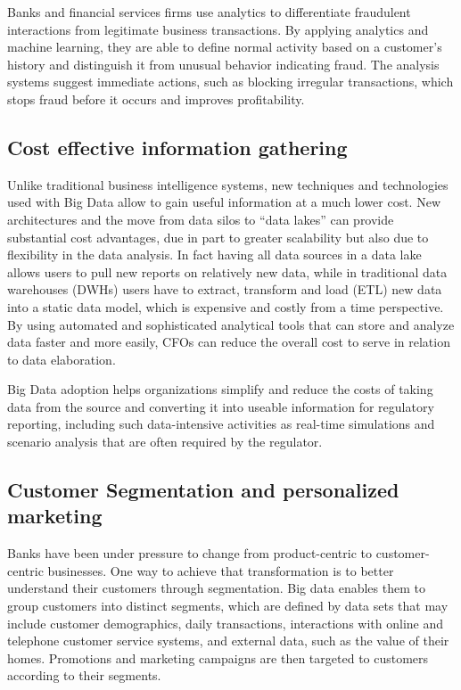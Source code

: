 \documentclass[sigconf]{acmart}
\begin{document}
Banks and financial services firms use analytics to differentiate fraudulent interactions from legitimate business transactions. By applying analytics and machine learning, they are able to define normal activity based on a customer's history and distinguish it from unusual behavior indicating fraud. The analysis systems suggest immediate actions, such as blocking irregular transactions, which stops fraud before it occurs and improves profitability.

\subsection{Cost effective information gathering}

Unlike traditional business intelligence systems, new techniques and technologies used with Big Data allow to gain useful information at a much lower cost. New architectures and the move from data silos to “data lakes” can provide substantial cost advantages, due in part
to greater scalability but also due to flexibility in the data analysis. In fact having all data sources in a data lake allows users to pull new reports on relatively new data, while in traditional data warehouses (DWHs) users have to extract, transform and load (ETL) new data into a static data model, which is expensive and costly from a time perspective. By using automated and sophisticated analytical tools that can store and analyze data faster and more easily, CFOs can reduce the overall cost to serve in relation to data elaboration.

Big Data adoption helps organizations
simplify and reduce the costs of taking
data from the source and converting it
into useable information for regulatory
reporting, including such data-intensive
activities as real-time simulations and
scenario analysis that are often required
by the regulator.

\subsection{Customer Segmentation and personalized marketing}

Banks have been under pressure to change from product-centric to customer-centric businesses. One way to achieve that transformation is  to better understand their customers through segmentation. Big data enables them to  group customers into distinct segments, which are defined by data sets that may include customer demographics, daily transactions, interactions with online and telephone customer service systems, and external data, such as the value of their homes. Promotions and marketing campaigns are then targeted to customers according to their  segments.
\end{document}
